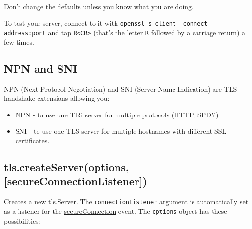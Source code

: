 Don't change the defaults unless you know what you are doing.

To test your server, connect to it with
\texttt{openssl s\_client -connect address:port} and tap
\texttt{R\textless{}CR\textgreater{}} (that's the letter \texttt{R}
followed by a carriage return) a few times.

\subsection{NPN and SNI}

NPN (Next Protocol Negotiation) and SNI (Server Name Indication) are TLS
handshake extensions allowing you:

\begin{itemize}
\item
  NPN - to use one TLS server for multiple protocols (HTTP, SPDY)
\item
  SNI - to use one TLS server for multiple hostnames with different SSL
  certificates.
\end{itemize}

\subsection{tls.createServer(options, {[}secureConnectionListener{]})}

Creates a new \hyperref[tls\_class\_tls\_server]{tls.Server}. The
\texttt{connectionListener} argument is automatically set as a listener
for the \hyperref[tls\_event\_secureconnection]{secureConnection} event.
The \texttt{options} object has these possibilities:

